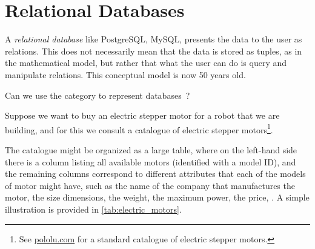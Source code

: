 
\section{Relational Databases}
\label{sec:relational-databases}


A \emph{relational database} like PostgreSQL, MySQL, \etc presents the data to the user as relations.
This does not necessarily mean that the data is stored as tuples, as in the mathematical model, but rather that what the user can do is query and manipulate relations.
This conceptual model is now 50 years old.

Can we use the category \Rel to represent databases~\cite{codd2002relational}?

Suppose we want to buy an electric stepper motor for a robot that we are building, and for this we consult a catalogue of electric stepper motors\footnote{See \href{https://www.pololu.com/category/87/stepper-motors}{pololu.com} for a standard catalogue of electric stepper motors.}.

The catalogue might be organized as a large table, where on the left-hand side there is a column listing all available motors (identified with a model ID), and the remaining columns correspond to different attributes that each of the models of motor might have, such as the name of the company that manufactures the motor, the size dimensions, the weight, the maximum power, the price, \etc.
A simple illustration is provided in \cref{tab:electric_motors}.

